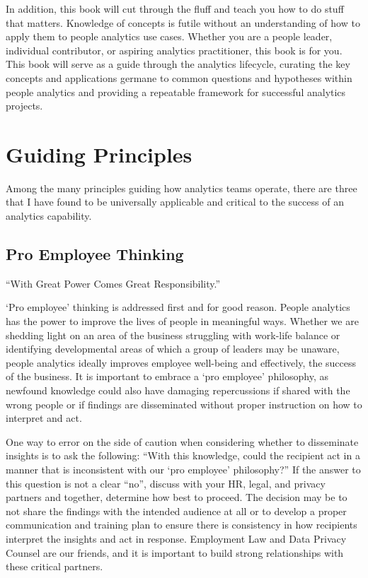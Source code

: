 \documentclass[
]{book}
\begin{document}
In addition, this book will cut through the fluff and teach you how to do stuff that matters. Knowledge of concepts is futile without an understanding of how to apply them to people analytics use cases. Whether you are a people leader, individual contributor, or aspiring analytics practitioner, this book is for you. This book will serve as a guide through the analytics lifecycle, curating the key concepts and applications germane to common questions and hypotheses within people analytics and providing a repeatable framework for successful analytics projects.

\hypertarget{guiding-principles}{%
\section{Guiding Principles}\label{guiding-principles}}

Among the many principles guiding how analytics teams operate, there are three that I have found to be universally applicable and critical to the success of an analytics capability.

\hypertarget{pro-employee-thinking}{%
\subsection{Pro Employee Thinking}\label{pro-employee-thinking}}

``With Great Power Comes Great Responsibility.''

`Pro employee' thinking is addressed first and for good reason. People analytics has the power to improve the lives of people in meaningful ways. Whether we are shedding light on an area of the business struggling with work-life balance or identifying developmental areas of which a group of leaders may be unaware, people analytics ideally improves employee well-being and effectively, the success of the business. It is important to embrace a `pro employee' philosophy, as newfound knowledge could also have damaging repercussions if shared with the wrong people or if findings are disseminated without proper instruction on how to interpret and act.

One way to error on the side of caution when considering whether to disseminate insights is to ask the following: ``With this knowledge, could the recipient act in a manner that is inconsistent with our `pro employee' philosophy?'' If the answer to this question is not a clear ``no'', discuss with your HR, legal, and privacy partners and together, determine how best to proceed. The decision may be to not share the findings with the intended audience at all or to develop a proper communication and training plan to ensure there is consistency in how recipients interpret the insights and act in response. Employment Law and Data Privacy Counsel are our friends, and it is important to build strong relationships with these critical partners.
\end{document}

